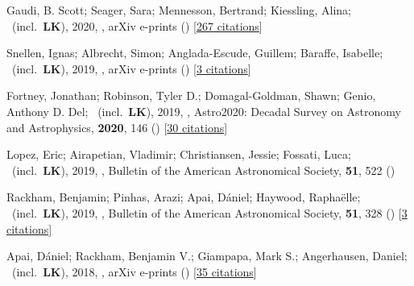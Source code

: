 \item[{\color{numcolor}\scriptsize9}] Gaudi, B. Scott; Seager, Sara; Mennesson, Bertrand; Kiessling, Alina; \etal\ (incl.\ \textbf{LK}), 2020, , arXiv e-prints () [\href{https://ui.adsabs.harvard.edu/abs/2020arXiv200106683G}{267 citations}]

\item[{\color{numcolor}\scriptsize8}] Snellen, Ignas; Albrecht, Simon; Anglada-Escude, Guillem; Baraffe, Isabelle; \etal\ (incl.\ \textbf{LK}), 2019, , arXiv e-prints () [\href{https://ui.adsabs.harvard.edu/abs/2019arXiv190801803S}{3 citations}]

\item[{\color{numcolor}\scriptsize7}] Fortney, Jonathan; Robinson, Tyler D.; Domagal-Goldman, Shawn; Genio, Anthony D. Del; \etal\ (incl.\ \textbf{LK}), 2019, , Astro2020: Decadal Survey on Astronomy and Astrophysics, \textbf{2020}, 146 () [\href{https://ui.adsabs.harvard.edu/abs/2019astro2020T.146F}{30 citations}]

\item[{\color{numcolor}\scriptsize6}] Lopez, Eric; Airapetian, Vladimir; Christiansen, Jessie; Fossati, Luca; \etal\ (incl.\ \textbf{LK}), 2019, , Bulletin of the American Astronomical Society, \textbf{51}, 522 ()

\item[{\color{numcolor}\scriptsize5}] Rackham, Benjamin; Pinhas, Arazi; Apai, D{\'a}niel; Haywood, Rapha{\"e}lle; \etal\ (incl.\ \textbf{LK}), 2019, , Bulletin of the American Astronomical Society, \textbf{51}, 328 () [\href{https://ui.adsabs.harvard.edu/abs/2019BAAS...51c.328R}{3 citations}]

\item[{\color{numcolor}\scriptsize4}] Apai, D{\'a}niel; Rackham, Benjamin V.; Giampapa, Mark S.; Angerhausen, Daniel; \etal\ (incl.\ \textbf{LK}), 2018, , arXiv e-prints () [\href{https://ui.adsabs.harvard.edu/abs/2018arXiv180308708A}{35 citations}]

